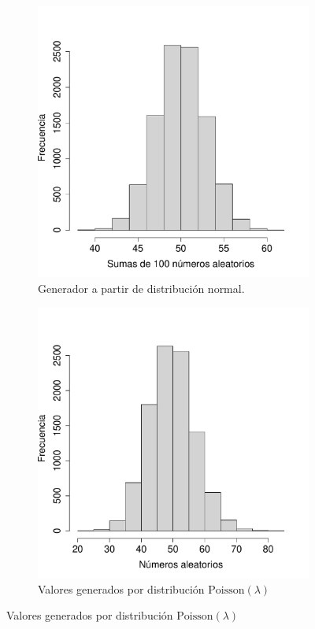 \documentclass[paper=leter, fontsize=11pt]{scrartcl}
\numberwithin{equation}{section}		%
\numberwithin{figure}{section}			%
\numberwithin{table}{section}				%
\begin{document}
\begin{figure}
    \begin{subfigure}{.5\textwidth}
        \centering
        \includegraphics[scale=0.4]{unif.pdf}
        \caption{Generador a partir de distribución normal.}
        \label{unif_izq}
    \end{subfigure}
    \begin{subfigure}{0.5\textwidth}
        \centering
        \includegraphics[scale=0.4]{unif_poisson.pdf}
        \caption{Valores generados por distribución $\text{Poisson}(\lambda)$}
        \label{unif_der}
    \end{subfigure}


\end{figure}
\end{document}
